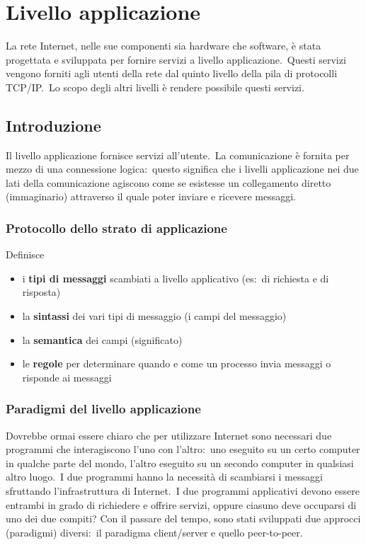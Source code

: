 \chapter{Livello applicazione}

La rete Internet, nelle sue componenti sia hardware che software, è stata progettata e sviluppata per fornire servizi a livello applicazione.\
Questi servizi vengono forniti agli utenti della rete dal quinto livello della pila di protocolli TCP/IP.\
Lo scopo degli altri livelli è rendere possibile questi servizi.

\section{Introduzione}

Il livello applicazione fornisce servizi all'utente.\
La comunicazione è fornita per mezzo di una connessione logica:\ questo significa che i livelli applicazione nei due lati della comunicazione agiscono come se esistesse un collegamento diretto (immaginario) attraverso il quale poter inviare e ricevere messaggi.

\subsection{Protocollo dello strato di applicazione}

Definisce
\begin{itemize}
    \item i \textbf{tipi di messaggi} scambiati a livello applicativo (es:\ di richiesta e di risposta)
    \item la \textbf{sintassi} dei vari tipi di messaggio (i campi del messaggio)
    \item la \textbf{semantica} dei campi (significato)
    \item le \textbf{regole} per determinare quando e come un processo invia messaggi o risponde ai messaggi
\end{itemize}

\subsection{Paradigmi del livello applicazione}

Dovrebbe ormai essere chiaro che per utilizzare Internet sono necessari due programmi che interagiscono l'uno con l'altro:\ uno eseguito su un certo computer in qualche parte del mondo, l'altro eseguito su un secondo computer in qualsiasi altro luogo.\
I due programmi hanno la necessità di scambiarsi i messaggi sfruttando l'infrastruttura di Internet.\
I due programmi applicativi devono essere entrambi in grado di richiedere e offrire servizi, oppure ciasuno deve occuparsi di uno dei due compiti? Con il passare del tempo, sono stati sviluppati due approcci (paradigmi) diversi:\ il paradigma client/server e quello peer-to-peer.


